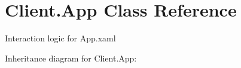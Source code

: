 \hypertarget{class_client_1_1_app}{}\section{Client.\+App Class Reference}
\label{class_client_1_1_app}


Interaction logic for App.\+xaml  




Inheritance diagram for Client.\+App\+:
